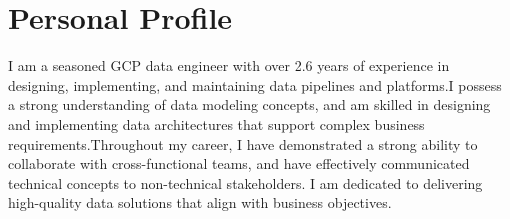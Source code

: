 
\section{Personal Profile}

I am a seasoned GCP data engineer with over 2.6 years of experience in designing, implementing, and maintaining data pipelines and platforms.I possess a strong understanding of data modeling concepts, and am skilled in designing and implementing data architectures that support complex business requirements.Throughout my career, I have demonstrated a strong ability to collaborate with cross-functional teams, and have effectively communicated technical concepts to non-technical stakeholders. I am dedicated to delivering high-quality data solutions that align with business objectives.